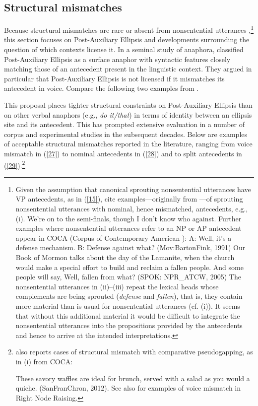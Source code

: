 \subsection{Structural mismatches}
\label{sec-structural-mismatches}

Because structural mismatches are rare or absent from nonsentential utterances \citep[see][]{Merchant2005a, Merchant2013},\footnote{Given the assumption that canonical sprouting nonsentential utterances have VP antecedents, as in (\ref{15}), \citet[95]{Ginzburg2018} cite examples---originally from \citet[13]{Beecher2008}---of sprouting nonsentential utterances with nominal, hence mismatched, antecedents, e.g., (i).
	\ea We're on to the semi-finals, though I don't know who against.\z
%
	Further examples where nonsentential utterances refer to an NP or AP antecedent appear in COCA (Corpus of Contemporary American ):
%
	\ea  A: Well, it's a defense mechanism. B: Defense against what? (Mov:BartonFink, 1991)\z
	\eanoraggedright
Our Book of Mormon talks about the day of the Lamanite, when the church would make a special effort to build and reclaim a fallen people. And some people will say, Well, fallen from what? (SPOK: NPR\_ATCW, 2005)\z
%
	The nonsentential utterances in (ii)--(iii) repeat the lexical heads whose complements are being sprouted (\textit{defense} and \textit{fallen}), that is, they contain more material than is usual for nonsentential utterances (cf. (i)). It seems that without this additional material it would be difficult to integrate the nonsentential utterances into the propositions provided by the antecedents and hence to arrive at the intended interpretations.} this section focuses on Post-Auxiliary Ellipsis and developments surrounding the question of which contexts license it. In a seminal study of anaphora, \citet{Hankamer1976} classified Post-Auxiliary Ellipsis as a surface anaphor with syntactic features closely matching those of an antecedent present in the linguistic context. They argued in particular that Post-Auxiliary Ellipsis is not licensed if it mismatches its antecedent in voice. Compare the following two examples from \citet[327]{Hankamer1976}.

\eal
{}
\zl
This proposal places tighter structural constraints on Post-Auxiliary Ellipsis than on other verbal anaphors (e.g., \textit{do it/that}) in terms of identity between an ellipsis site and its antecedent. This has prompted extensive evaluation in a number of corpus and experimental studies in the subsequent decades. Below are examples of acceptable structural mismatches reported in the literature, ranging from voice mismatch in (\ref{27}) to nominal antecedents in (\ref{28}) and to split antecedents in (\ref{29}).\footnote{\citet[87]{Miller2014} also reports cases of structural mismatch with  comparative pseudogapping, as in (i) from COCA:

\ea These savory waffles are ideal for brunch, served with a salad as you would a quiche. (SanFranChron, 2012).\z
%
See also \citet{Abeille2016} for examples of voice mismatch in  Right Node Raising. 
}

